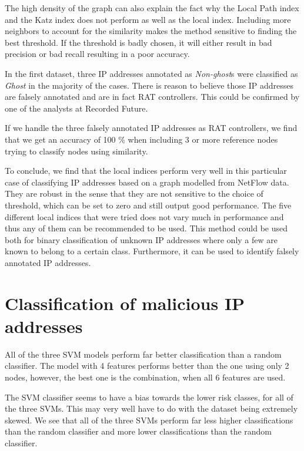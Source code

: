 The high density of the graph can also explain the fact why the Local Path index and the Katz index does not perform as well as the local index. Including more neighbors to account for the similarity makes the method sensitive to finding the best threshold. If the threshold is badly chosen, it will either result in bad precision or bad recall resulting in a poor accuracy.

In the first dataset, three IP addresses annotated as \textit{Non-ghost}s were classified as \textit{Ghost} in the majority of the cases. There is reason to believe those IP addresses are falsely annotated and are in fact RAT controllers. This could be confirmed by one of the analysts at Recorded Future.

If we handle the three falsely annotated IP addresses as RAT controllers, we find that we get an accuracy of 100 \% when including 3 or more reference nodes trying to classify nodes using similarity. 

To conclude, we find that the local indices perform very well in this particular case of classifying IP addresses based on a graph modelled from NetFlow data. They are robust in the sense that they are not sensitive to the choice of threshold, which can be set to zero and still output good performance. The five different local indices that were tried does not vary much in performance and thus any of them can be recommended to be used. This method could be used both for binary classification of unknown IP addresses where only a few are known to belong to a certain class. Furthermore, it can be used to identify falsely annotated IP addresses. 

\section{Classification of malicious IP addresses}
All of the three SVM models perform far better classification than a random classifier. The model with 4 features performs better than the one using only 2 nodes, however, the best one is the combination, when all 6 features are used. 

The SVM classifier seems to have a bias towards the lower risk classes, for all of the three SVMs. This may very well have to do with the dataset being extremely skewed. We see that all of the three SVMs perform far less higher classifications than the random classifier and more lower classifications than the random classifier.


